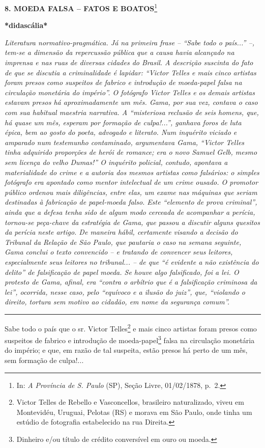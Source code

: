 \textbf{8. MOEDA FALSA -- FATOS E BOATOS}\footnote{In: \emph{A Província
  de S. Paulo} (SP), Seção Livre, 01/02/1878, p.~2.}

\textbf{*didascália*}

\emph{Literatura normativo-pragmática. Já na primeira frase -- ``Sabe
todo o país...'' --, tem-se a dimensão da repercussão pública que a
causa havia alcançado na imprensa e nas ruas de diversas cidades do
Brasil. A descrição suscinta do fato de que se discutia a criminalidade
é lapidar: ``Victor Telles e mais cinco artistas foram presos como
suspeitos de fabrico e introdução de moeda-papel falsa na circulação
monetária do império''. O fotógrafo Victor Telles e os demais artistas
estavam presos há aproximadamente um mês. Gama, por sua vez, contava o
caso com sua habitual maestria narrativa. A ``misteriosa reclusão de
seis homens, que, há quase um mês, esperam por formação de culpa!...'',
ganhava foros de luta épica, bem ao gosto do poeta, advogado e literato.
Num inquérito viciado e amparado num testemunho contaminado, argumentava
Gama, ``Victor Telles tinha adquirido proporções de herói de romance;
era o novo Samuel Gelb, mesmo sem licença do velho Dumas!'' O inquérito
policial, contudo, apontava a materialidade do crime e a autoria dos
mesmos artistas como falsários: o simples fotógrafo era apontado como
mentor intelectual de um crime ousado. O promotor público ordenou mais
diligências, entre elas, um exame nas máquinas que seriam destinadas à
fabricação de papel-moeda falso. Este ``elemento de prova criminal'',
ainda que a defesa tenha sido de algum modo cerceada de acompanhar a
perícia, tornou-se peça-chave da estratégia de Gama, que passou a
discutir alguns quesitos da perícia neste artigo. De maneira hábil,
certamente visando a decisão do Tribunal da Relação de São Paulo, que
pautaria o caso na semana seguinte, Gama conclui o texto convencido -- e
tratando de convencer seus leitores, especialmente seus leitores no
tribunal... -- de que ``é evidente a não existência do delito'' de
falsificação de papel moeda. Se houve algo falsificado, foi a lei. O
protesto de Gama, afinal, era ``contra o arbítrio que é a falsificação
criminosa da lei'', ocorrida, nesse caso, pelo ``equívoco e a ilusão do
juiz'', que, ``violando o direito, tortura sem motivo ao cidadão, em
nome da segurança comum''. }

\begin{center}\rule{0.5\linewidth}{\linethickness}\end{center}

Sabe todo o país que o sr. Victor Telles\footnote{Victor Telles de
  Rebello e Vasconcellos, brasileiro naturalizado, viveu em Montevidéu,
  Uruguai, Pelotas (RS) e morava em São Paulo, onde tinha um estúdio de
  fotografia estabelecido na rua Direita.} e mais cinco artistas foram
presos como suspeitos de fabrico e introdução de moeda-papel\footnote{Dinheiro
  e/ou título de crédito conversível em ouro ou moeda.} falsa na
circulação monetária do império; e que, em razão de tal suspeita, estão
presos há perto de um mês, sem formação de culpa!...

